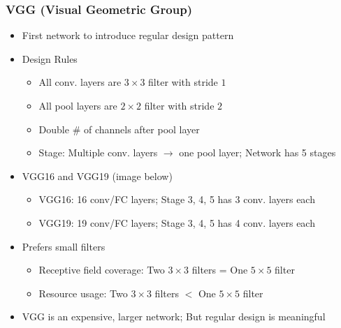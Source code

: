\subsubsection*{VGG (Visual Geometric Group)}
\begin{itemize}
    \item First network to introduce regular design pattern
    \item Design Rules
    \begin{itemize}
        \item All conv. layers are $3\times3$ filter with stride $1$
        \item All pool layers are $2\times2$ filter with stride $2$
        \item Double \# of channels after pool layer
        \item Stage: Multiple conv. layers $\rightarrow$ one pool layer; Network has 5 stages
    \end{itemize}
    \item VGG16 and VGG19 (image below)
    \begin{itemize}
        \item VGG16: 16 conv/FC layers; Stage 3, 4, 5 has 3 conv. layers each
        \item VGG19: 19 conv/FC layers; Stage 3, 4, 5 has 4 conv. layers each
    \end{itemize}
    \item Prefers small filters
    \begin{itemize}
        \item Receptive field coverage: Two $3\times3$ filters = One $5\times5$ filter
        \item Resource usage: Two $3\times3$ filters $<$ One $5\times5$ filter
    \end{itemize}
    \item VGG is an expensive, larger network; But regular design is meaningful
\end{itemize}
\begin{figures}
\end{figures}


